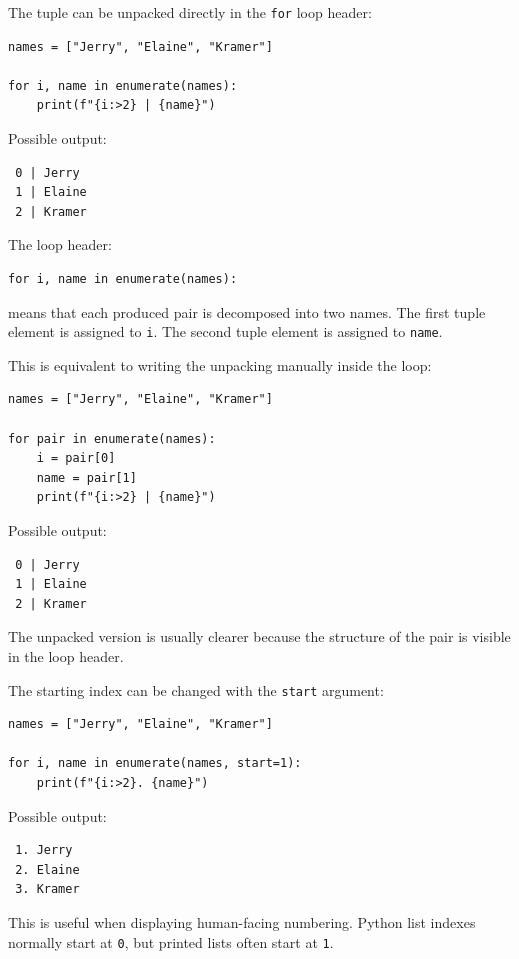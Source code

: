 The tuple can be unpacked directly in the \texttt{for} loop header:

\begin{verbatim}
names = ["Jerry", "Elaine", "Kramer"]

for i, name in enumerate(names):
    print(f"{i:>2} | {name}")
\end{verbatim}

Possible output:

\begin{verbatim}
 0 | Jerry
 1 | Elaine
 2 | Kramer
\end{verbatim}

The loop header:

\begin{verbatim}
for i, name in enumerate(names):
\end{verbatim}

means that each produced pair is decomposed into two names. The first tuple element is assigned to \texttt{i}. The second tuple element is assigned to \texttt{name}.

This is equivalent to writing the unpacking manually inside the loop:

\begin{verbatim}
names = ["Jerry", "Elaine", "Kramer"]

for pair in enumerate(names):
    i = pair[0]
    name = pair[1]
    print(f"{i:>2} | {name}")
\end{verbatim}

Possible output:

\begin{verbatim}
 0 | Jerry
 1 | Elaine
 2 | Kramer
\end{verbatim}

The unpacked version is usually clearer because the structure of the pair is visible in the loop header.

The starting index can be changed with the \texttt{start} argument:

\begin{verbatim}
names = ["Jerry", "Elaine", "Kramer"]

for i, name in enumerate(names, start=1):
    print(f"{i:>2}. {name}")
\end{verbatim}

Possible output:

\begin{verbatim}
 1. Jerry
 2. Elaine
 3. Kramer
\end{verbatim}

This is useful when displaying human-facing numbering. Python list indexes normally start at \texttt{0}, but printed lists often start at \texttt{1}.

